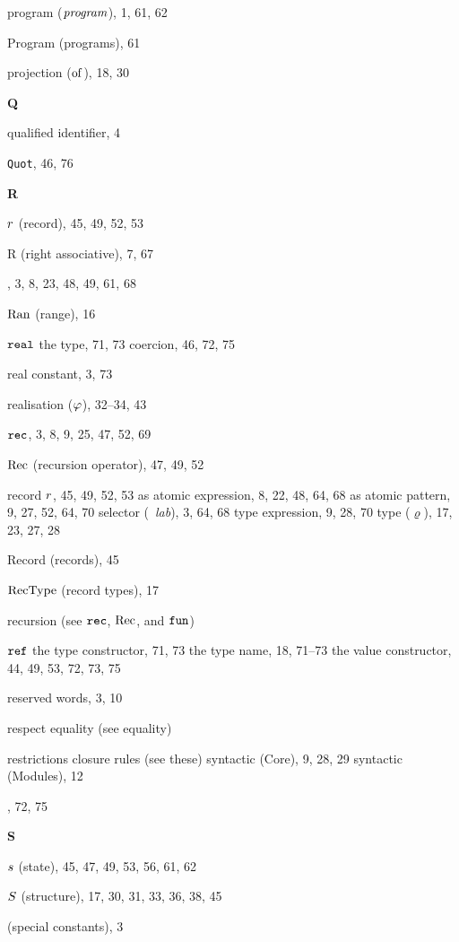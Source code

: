 \begin{theindex}
\item program ($\program$), 1, 61, 62
\item Program (programs), 61
\item projection ($\of{}{}$), 18, 30
\indexspace
\parbox{65mm}{\hfil{\large\bf Q}\hfil}
\indexspace
\item qualified identifier, 4
\item {\tt Quot}, 46, 76
\indexspace
\parbox{65mm}{\hfil{\large\bf R}\hfil}
\indexspace
\item $\r$ (record), 45, 49, 52, 53
\item R (right associative), 7, 67
\item \RAISE, 3, 8, 23, 48, 49, 61, 68
\item $\Ran$ (range), 16
\item $\REAL$ 
\subitem the type, 71, 73
\subitem coercion, 46, 72, 75
\item real constant, 3, 73
\item realisation ($\rea$), 32--34, 43
\item $\REC$, 3, 8, 9, 25, 47, 52, 69
\item $\Rec$ (recursion operator), 47, 49, 52
\item record  
\subitem $\r$, 45, 49, 52, 53
\subitem as atomic expression, 8, 22, 48, 64, 68
\subitem as atomic pattern, 9, 27, 52, 64, 70
\subitem selector (\ml{\#}\ {\it lab}), 3, 64, 68
\subitem type expression, 9, 28, 70
\subitem type ($\varrho$), 17, 23, 27, 28
\item Record (records), 45
\item $\RecType$ (record types), 17
\item recursion (see $\REC$, $\Rec$, and $\FUN$) 
\item $\REF$ 
\subitem the type constructor, 71, 73
\subitem the type name, 18, 71--73
\subitem the value constructor, 44, 49, 53, 72, 73, 75
\item reserved words, 3, 10
\item respect equality (see equality) 
\item restrictions 
\subitem closure rules (see these) 
\subitem syntactic (Core), 9, 28, 29
\subitem syntactic (Modules), 12
\item {}, 72, 75
\indexspace
\parbox{65mm}{\hfil{\large\bf S}\hfil}
\indexspace
\item $\s$ (state), 45, 47, 49, 53, 56, 61, 62
\item $\S$ (structure), 17, 30, 31, 33, 36, 38, 45
\item {\SCon} (special constants), 3

\end{theindex}

